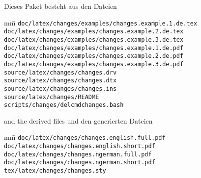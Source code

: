 		Dieses Paket besteht aus den Dateien
	\fi

\begin{tabbing}
	mm\=\kill
	\>\texttt{doc/latex/changes/examples/changes.example.1.de.tex}\\
	\>\texttt{doc/latex/changes/examples/changes.example.2.de.tex}\\
	\>\texttt{doc/latex/changes/examples/changes.example.3.de.tex}\\
	\>\texttt{doc/latex/changes/examples/changes.example.1.de.pdf}\\
	\>\texttt{doc/latex/changes/examples/changes.example.2.de.pdf}\\
	\>\texttt{doc/latex/changes/examples/changes.example.3.de.pdf}\\

	\>\texttt{source/latex/changes/changes.drv}\\
	\>\texttt{source/latex/changes/changes.dtx}\\
	\>\texttt{source/latex/changes/changes.ins}\\
	\>\texttt{source/latex/changes/README}\\

	\>\texttt{scripts/changes/delcmdchanges.bash}
\end{tabbing}

\ifENGLISH
	and the derived files
\fi
	\ifGERMAN
		und den generierten Dateien
	\fi

\begin{tabbing}
	mm\=\kill
	\>\texttt{doc/latex/changes/changes.english.full.pdf}\\
	\>\texttt{doc/latex/changes/changes.english.short.pdf}\\
	\>\texttt{doc/latex/changes/changes.ngerman.full.pdf}\\
	\>\texttt{doc/latex/changes/changes.ngerman.short.pdf}\\

	\>\texttt{tex/latex/changes/changes.sty}
\end{tabbing}


